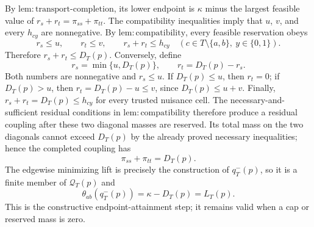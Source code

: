 By \(\mathrm{lem{:}transport\mbox{-}completion}\), its lower endpoint is
\(\kappa\) minus the largest feasible value of
\(r_s+r_t=\pi_{ss}+\pi_{tt}\).  The compatibility inequalities imply that
\(u\), \(v\), and every \(h_{cy}\) are nonnegative.  By
\(\mathrm{lem{:}compatibility}\), every feasible reservation obeys
\[
 r_s\le u,\qquad r_t\le v,
 \qquad r_s+r_t\le h_{cy}
 \quad(c\in T\setminus\{a,b\},\ y\in\{0,1\}).
\]
Therefore \(r_s+r_t\le D_T(p)\).  Conversely, define
\[
 r_s=\min\{u,D_T(p)\},\qquad r_t=D_T(p)-r_s.
\]
Both numbers are nonnegative and \(r_s\le u\).  If \(D_T(p)\le u\), then
\(r_t=0\); if \(D_T(p)>u\), then
\(r_t=D_T(p)-u\le v\), since \(D_T(p)\le u+v\).  Finally,
\(r_s+r_t=D_T(p)\le h_{cy}\) for every trusted nuisance cell.  The
necessary-and-sufficient residual conditions in
\(\mathrm{lem{:}compatibility}\) therefore produce a residual coupling
after these two diagonal masses are reserved.  Its total mass on the two
diagonals cannot exceed \(D_T(p)\) by the already proved necessary
inequalities; hence the completed coupling has
\[
 \pi_{ss}+\pi_{tt}=D_T(p).
\]
The edgewise minimizing lift is precisely the construction of
\(q^-_T(p)\), so it is a finite member of \(\mathcal Q_T(p)\) and
\[
 \theta_{ab}(q^-_T(p))=\kappa-D_T(p)=L_T(p). \tag{1}
\]
This is the constructive endpoint-attainment step; it remains valid when a
cap or reserved mass is zero.

